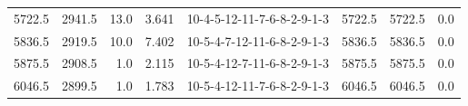 \begin{tabular}{rrrrlrrr}
 5722.5 &  2941.5 &           13.0 &              3.641 &  10-4-5-12-11-7-6-8-2-9-1-3 &        5722.5 &          5722.5 &       0.0 \\
 5836.5 &  2919.5 &           10.0 &              7.402 &  10-5-4-7-12-11-6-8-2-9-1-3 &        5836.5 &          5836.5 &       0.0 \\
 5875.5 &  2908.5 &            1.0 &              2.115 &  10-5-4-12-7-11-6-8-2-9-1-3 &        5875.5 &          5875.5 &       0.0 \\
 6046.5 &  2899.5 &            1.0 &              1.783 &  10-5-4-12-11-7-6-8-2-9-1-3 &        6046.5 &          6046.5 &       0.0 \\
\bottomrule
\end{tabular}
